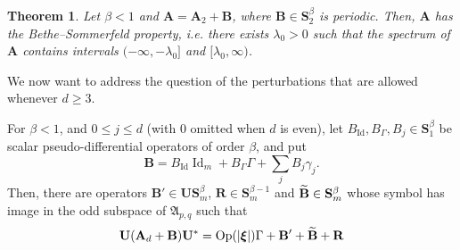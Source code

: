 \documentclass[10pt]{amsart}
\newtheorem{theo}{Theorem}[section]
\theoremstyle{definition}\newtheorem{defi}[theo]{Definition}\newtheorem{rema}[theo]{Remark}\newtheorem{exam}[theo]{Example}\newtheorem{nota}[theo]{Notation}
\DeclareMathOperator{\Op}{Op}
\DeclareMathOperator{\Id}{Id}
\newcommand{\bxi}{\boldsymbol \xi}
\newcommand{\BA}{\mathbf A}
\newcommand{\BB}{\mathbf B}
\newcommand{\BS}{\mathbf S}
\newcommand{\BR}{\mathbf R}
\newcommand{\BU}{\mathbf U}
\newcommand{\FA}{\mathfrak A}
\newcommand{\abs}[1]{\left\lvert #1 \right\rvert}
\let\oldtilde\tilde
\renewcommand*{\tilde}[1]{\mathchoice{\widetilde{#1}}{\widetilde{#1}}{\oldtilde{#1}}{\oldtilde{#1}}}
\begin{document}
\begin{theo}
Let $\beta < 1 $ and $\BA = \BA_2 + \BB$, where $\BB \in \BS_2^\beta$ is periodic. Then, $\BA$ has the Bethe--Sommerfeld property, i.e. there exists $\lambda_0 > 0 $ such that the spectrum of $\BA$ contains intervals $(-\infty, -\lambda_0]$ and $[\lambda_0,\infty)$.
\end{theo}

We now want to address the question of the perturbations that are allowed whenever $d \ge 3$.


\begin{prop}\label{prop:permittedperturbations}
For $\beta < 1$, and $0 \le j \le d$ (with $0$ omitted when $d$ is even), let $B_{\Id}, B_\Gamma, B_j \in \BS_1^\beta$ be scalar pseudo-differential operators of order $\beta$, and put
\begin{equation}
\BB = B_{\Id} \Id_m + B_\Gamma \Gamma + \sum_j B_j \gamma_j.
\end{equation}
Then, there are operators $\BB' \in \BU\BS^\beta_m$, $\BR \in \BS_m^{\beta -1 }$ and $\tilde \BB \in
\BS_m^\beta$ whose symbol has image in the odd subspace of $\FA_{p,q}$ such that
\begin{equation}\label{eq:afterunit}
\BU (\BA_d + \BB) \BU^* = \Op(\abs \bxi) \Gamma + \BB' + \tilde \BB + \BR
\end{equation}
\end{prop}
\end{document}
